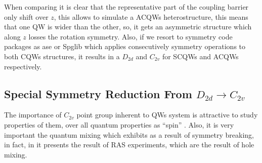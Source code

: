 When comparing  it is clear that the representative part of the coupling barrier only shift over $z$, this allows to simulate a \gls{ACQWs} heterostructure, this means that one \gls{QW} is wider than the other, so, it gets an asymmetric structure which along $z$ losses the rotation symmetry. Also, if we resort to symmetry code packages as \gls{ase} or \gls{Spglib} which applies consecutively symmetry operations to both \gls{CQWs} structures, it results in a $D_{2d}$ and $C_{2v}$ for \gls{SCQWs} and \gls{ACQWs} respectively.  
 
\subsection{Special Symmetry Reduction From $D_{2d}\to C_{2v}$}
\label{subsubsec:chapter-2-special-symmetry}
\vspace{-10mm} 
The importance of $C_{2v}$ point group inherent to QWs system is attractive to study properties of them, over all quantum properties as ``spin'' \cite{andrada1997spin,luo2015supercoupling,ivchenko2008spinphoto,glazov2018electron,winkler2003spin,ohrmann2004anomalousspin}. Also, it is very important the quantum mixing which exhibits as a result of symmetry breaking, in fact, in  it presents the result of RAS experiments,  which are the result of hole mixing. 

